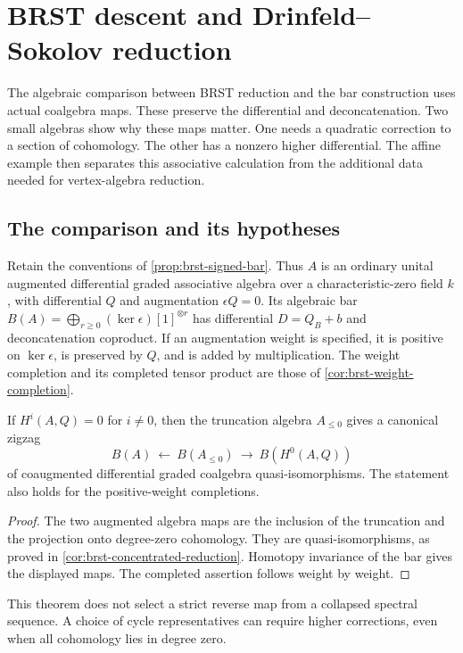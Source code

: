\chapter{BRST descent and Drinfeld--Sokolov reduction}\label{chap:brst}
The algebraic comparison between BRST reduction and the bar
construction uses actual coalgebra maps.
These preserve the differential and deconcatenation.
Two small algebras show why these maps matter.
One needs a quadratic correction to a section of cohomology.
The other has a nonzero higher differential.
The affine example then separates this associative calculation
from the additional data needed for vertex-algebra reduction.

\section{The comparison and its hypotheses}
Retain the conventions of \cref{prop:brst-signed-bar}.
Thus $A$ is an ordinary unital augmented differential graded
associative algebra over a characteristic-zero field $k$,
with differential $Q$ and augmentation $\epsilon Q=0$.
Its algebraic bar $B(A)=\bigoplus_{r\geq0}(\ker\epsilon)[1]^{\otimes r}$
has differential $D=Q_B+b$ and deconcatenation coproduct.
If an augmentation weight is specified, it is positive on
$\ker\epsilon$, is preserved by $Q$, and is added by multiplication.
The weight completion and its completed tensor product are those
of \cref{cor:brst-weight-completion}.

\begin{theorem}\label{thm:bar-brst}
If $H^i(A,Q)=0$ for $i\ne0$, then the truncation algebra
$A_{\leq0}$ gives a canonical zigzag
\[
 B(A)\ \longleftarrow\ B(A_{\leq0})
 \ \longrightarrow\ B(H^0(A,Q))
\]
of coaugmented differential graded coalgebra quasi-isomorphisms.
The statement also holds for the positive-weight completions.
\end{theorem}
\begin{proof}
The two augmented algebra maps are the inclusion of the
truncation and the projection onto degree-zero cohomology.
They are quasi-isomorphisms, as proved in
\cref{cor:brst-concentrated-reduction}.
Homotopy invariance of the bar gives the displayed maps.
The completed assertion follows weight by weight.
\end{proof}
This theorem does not select a strict reverse map from a collapsed
spectral sequence.  A choice of cycle representatives can require
higher corrections, even when all cohomology lies in degree zero.

